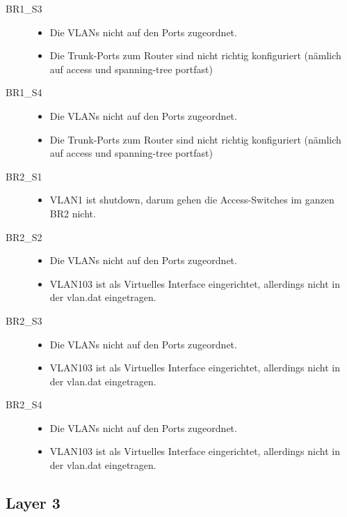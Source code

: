 \begin{description}
\begin{itemize}
	  \end{itemize}
	\item[BR1\_S3] \hfill
	  \begin{itemize} 
		  \item Die VLANs nicht auf den Ports zugeordnet. 
		  \item Die Trunk-Ports zum Router sind nicht richtig konfiguriert (nämlich auf access und spanning-tree portfast)
	  \end{itemize}
	\item[BR1\_S4] \hfill
	  \begin{itemize} 
		  \item Die VLANs nicht auf den Ports zugeordnet. 
		  \item Die Trunk-Ports zum Router sind nicht richtig konfiguriert (nämlich auf access und spanning-tree portfast)
	  \end{itemize}
	\item[BR2\_S1] \hfill
		\begin{itemize}
			\item VLAN1 ist shutdown, darum gehen die Access-Switches im ganzen BR2 nicht.
		\end{itemize}
	\item[BR2\_S2] \hfill
	  \begin{itemize}
		  \item Die VLANs nicht auf den Ports zugeordnet.
		  \item VLAN103 ist als Virtuelles Interface eingerichtet, allerdings nicht in der vlan.dat eingetragen.
		\end{itemize}
	\item[BR2\_S3] \hfill
	  \begin{itemize}
	  	\item Die VLANs nicht auf den Ports zugeordnet.
		  \item VLAN103 ist als Virtuelles Interface eingerichtet, allerdings nicht in der vlan.dat eingetragen.
		\end{itemize}
	\item[BR2\_S4] \hfill
	  \begin{itemize}
	  	\item Die VLANs nicht auf den Ports zugeordnet.
		  \item VLAN103 ist als Virtuelles Interface eingerichtet, allerdings nicht in der vlan.dat eingetragen.
		\end{itemize}
\end{description}

\subsection{Layer 3}
